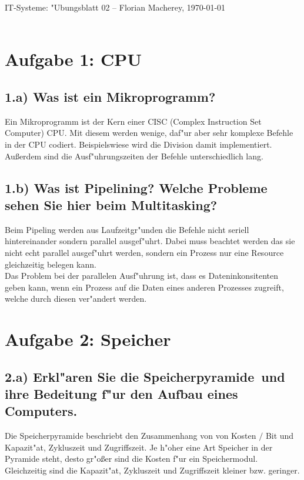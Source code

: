 \documentclass{article}
\begin{document}
{\Large \centering \textsf{IT-Systeme: "Ubungsblatt 02} -- Florian Macherey, \today}\\
\noindent\makebox[\linewidth]{\rule{\textwidth}{0.2pt}} \\


\section*{Aufgabe 1: CPU}
\subsection*{1.a) Was ist ein Mikroprogramm?}
Ein Mikroprogramm ist der Kern einer CISC (Complex Instruction Set Computer) 
CPU. Mit diesem werden wenige, daf"ur aber sehr komplexe Befehle in der CPU 
codiert. Beispielswiese wird die Division damit implementiert. Au\ss erdem sind 
die Ausf"uhrungszeiten der Befehle unterschiedlich lang. 

\subsection*{1.b) Was ist Pipelining? Welche Probleme sehen Sie hier beim 
Multitasking?}
Beim Pipeling werden aus Laufzeitgr"unden die Befehle nicht seriell hintereinander 
sondern parallel ausgef"uhrt. Dabei muss beachtet werden das sie nicht echt 
parallel ausgef"uhrt werden, sondern ein Prozess nur eine Resource gleichzeitig 
belegen kann. \\

Das Problem bei der parallelen Ausf"uhrung ist, dass es Dateninkonsitenten geben 
kann, wenn ein Prozess auf die Daten eines anderen Prozesses zugreift, welche 
durch diesen ver"andert werden. 

\section*{Aufgabe 2: Speicher}
\subsection*{2.a) Erkl"aren Sie die \dq Speicherpyramide\dq ~und ihre 
Bedeitung f"ur den Aufbau eines Computers.}
Die Speicherpyramide beschriebt den Zusammenhang von von Kosten $/$ Bit und 
Kapazit"at, Zykluszeit und Zugriffszeit.  Je h"oher eine Art Speicher in der 
Pyramide steht, desto gr"o\ss er sind die Kosten f"ur ein Speichermodul. 
Gleichzeitig sind die Kapazit"at, Zykluszeit und Zugriffszeit kleiner bzw. geringer. 
\\
\end{document}
